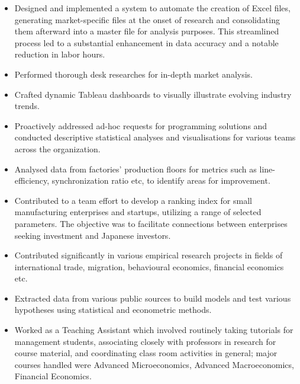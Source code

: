 \documentclass[9pt,a4paper]{altacv}
\begin{document}
\begin{paracol}{2}
\begin{itemize}
    \item Designed and implemented a system to automate the creation of Excel files, generating market-specific files at the onset of research and consolidating them afterward into a master file for analysis purposes. This streamlined process led to a substantial enhancement in data accuracy and a notable reduction in labor hours.
    \item Performed thorough desk researches for in-depth market analysis.
    \item Crafted dynamic Tableau dashboards to visually illustrate evolving industry trends.
    \item Proactively addressed ad-hoc requests for programming solutions and conducted descriptive statistical analyses and visualisations for various teams across the organization.
\end{itemize}
\divider
{}
\begin{itemize}
    \item Analysed data from factories’ production floors for metrics such as line-efficiency, synchronization ratio etc, to identify areas for improvement.
    \item Contributed to a team effort to develop a ranking index for small manufacturing enterprises and startups, utilizing a range of selected parameters. The objective was to facilitate connections between enterprises seeking investment and Japanese investors.
\end{itemize}
\divider
{}
\begin{itemize}
    \item Contributed significantly in various empirical research projects in fields of international trade, migration, behavioural economics, financial economics etc.
    \item Extracted data from various public sources to build models and test various hypotheses using statistical and econometric methods.
    \item Worked as a Teaching Assistant which involved routinely taking tutorials for management students, associating closely with professors in research for course material, and coordinating class room activities in general; major courses handled were Advanced Microeconomics, Advanced Macroeconomics, Financial Economics.

\end{itemize}
\end{paracol}
\end{document}

